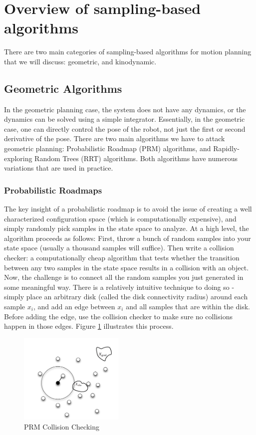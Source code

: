 \documentclass[twoside]{article}
\begin{document}
\section{Overview of sampling-based algorithms} %
There are two main categories of sampling-based algorithms for motion planning that we will discuss: geometric, and kinodynamic. 

\subsection{Geometric Algorithms}
In the geometric planning case, the system does not have any dynamics, or the dynamics can be solved using a simple integrator. Essentially, in the geometric case, one can directly control the pose of the robot, not just the first or second derivative of the pose. There are two main algorithms we have to attack geometric planning: Probabilistic Roadmap (PRM) algorithms, and Rapidly-exploring Random Trees (RRT) algorithms. Both algorithms have numerous variations that are used in practice. 

\subsubsection{Probabilistic Roadmaps}
The key insight of a probabilistic roadmap is to avoid the issue of creating a well characterized configuration space (which is computationally expensive), and simply randomly pick samples in the state space to analyze. At a high level, the algorithm proceeds as follows: First, throw a bunch of random samples into your state space (usually a thousand samples will suffice). Then write a collision checker: a computationally cheap algorithm that tests whether the transition between any two samples in the state space results in a collision with an object. Now, the challenge is to connect all the random samples you just generated in some meaningful way. There is a relatively intuitive technique to doing so - simply place an arbitrary disk (called the disk connectivity radius) around each sample $x_i$, and add an edge between $x_i$ and all samples that are within the disk. Before adding the edge, use the collision checker to make sure no collisions happen in those edges. Figure \ref{fig:prm_collision} illustrates this process.

\begin{figure}[h!]
  \centering
  \includegraphics[width=50mm]{prm_collision.png}
  \caption{PRM Collision Checking}
  \label{fig:prm_collision}
\end{figure}
\end{document}
